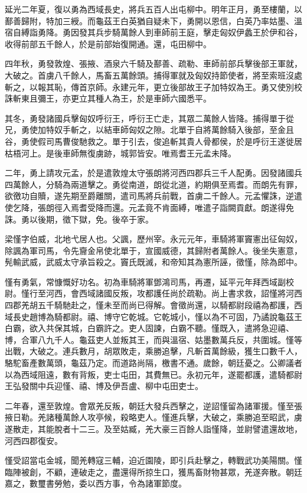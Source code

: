 \begin{pinyinscope}
延光二年夏，復以勇為西域長史，將兵五百人出屯柳中。明年正月，勇至樓蘭，以鄯善歸附，特加三綬。而龜茲王白英猶自疑未下，勇開以恩信，白英乃率姑墨、溫宿自縛詣勇降。勇因發其兵步騎萬餘人到車師前王庭，擊走匈奴伊蠡王於伊和谷，收得前部五千餘人，於是前部始復開通。還，屯田柳中。

四年秋，勇發敦煌、張掖、酒泉六千騎及鄯善、疏勒、車師前部兵擊後部王軍就，大破之。首虜八千餘人，馬畜五萬餘頭。捕得軍就及匈奴持節使者，將至索班沒處斬之，以報其恥，傳首京師。永建元年，更立後部故王子加特奴為王。勇又使別校誅斬東且彌王，亦更立其種人為王，於是車師六國悉平。

其冬，勇發諸國兵擊匈奴呼衍王，呼衍王亡走，其眾二萬餘人皆降。捕得單于從兄，勇使加特奴手斬之，以結車師匈奴之隙。北單于自將萬餘騎入後部，至金且谷，勇使假司馬曹俊馳救之。單于引去，俊追斬其貴人骨都侯，於是呼衍王遂徙居枯梧河上。是後車師無復虜跡，城郭皆安。唯焉耆王元孟未降。

二年，勇上請攻元孟，於是遣敦煌太守張朗將河西四郡兵三千人配勇。因發諸國兵四萬餘人，分騎為兩道擊之。勇從南道，朗從北道，約期俱至焉耆。而朗先有罪，欲徼功自贖，遂先期至爵離關，遣司馬將兵前戰，首虜二千餘人。元孟懼誅，逆遣使乞降，張朗徑入焉耆受降而還。元孟竟不肯面縛，唯遣子詣闕貢獻。朗遂得免誅。勇以後期，徵下獄，免。後卒于家。

梁慬字伯威，北地弋居人也。父諷，歷州宰。永元元年，車騎將軍竇憲出征匈奴，除諷為軍司馬，令先齎金帛使北單于，宣國威德，其歸附者萬餘人。後坐失憲意，髡輸武威，武威太守承旨殺之。竇氏既滅，和帝知其為憲所誣，徵慬，除為郎中。

慬有勇氣，常慷慨好功名。初為車騎將軍鄧鴻司馬，再遷，延平元年拜西域副校尉。慬行至河西，會西域諸國反叛，攻都護任尚於疏勒。尚上書求救，詔慬將河西四郡羌胡五千騎馳赴之，慬未至而尚已得解。會徵尚還，以騎都尉段禧為都護，西域長史趙博為騎都尉。禧、博守它乾城。它乾城小，慬以為不可固，乃譎說龜茲王白霸，欲入共保其城，白霸許之。吏人固諫，白霸不聽。慬既入，遣將急迎禧、博，合軍八九千人。龜茲吏人並叛其王，而與溫宿、姑墨數萬兵反，共圍城。慬等出戰，大破之。連兵數月，胡眾敗走，乘勝追擊，凡斬首萬餘級，獲生口數千人，駱駝畜產數萬頭，龜茲乃定。而道路尚隔，檄書不通。歲餘，朝廷憂之。公卿議者以為西域阻遠，數有背叛，吏士屯田，其費無已。永初元年，遂罷都護，遣騎都尉王弘發關中兵迎慬、禧、博及伊吾盧、柳中屯田吏士。

二年春，還至敦煌。會眾羌反叛，朝廷大發兵西擊之，逆詔慬留為諸軍援。慬至張掖日勒。羌諸種萬餘人攻亭候，殺略吏人。慬進兵擊，大破之，乘勝追至昭武，虜遂散走，其能脫者十二三。及至姑臧，羌大豪三百餘人詣慬降，並尉譬遣還故地，河西四郡復安。

慬受詔當屯金城，聞羌轉寇三輔，迫近園陵，即引兵赴擊之，轉戰武功美陽關。慬臨陣被創，不顧，連破走之，盡還得所掠生口，獲馬畜財物甚眾，羌遂奔散。朝廷嘉之，數璽書勞勉，委以西方事，令為諸軍節度。


\end{pinyinscope}

